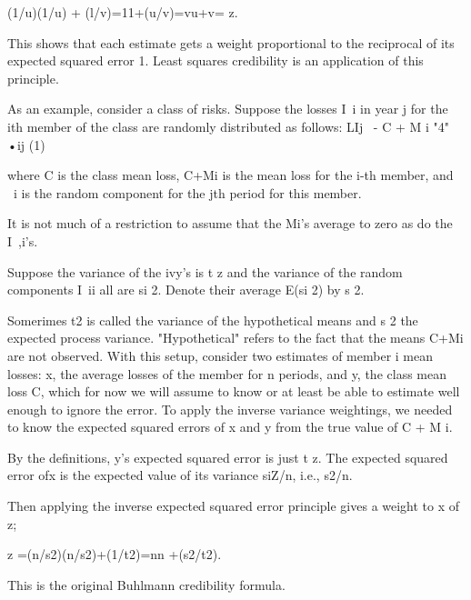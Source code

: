   (1/u)(1/u) + (l/v)=11+(u/v)=vu+v= z.

This shows that each estimate gets a weight proportional to the reciprocal of its expected squared error 1. Least squares credibility is
an application of this principle.

As an example, consider a class of risks. Suppose the losses I~i in year j for the ith member of the
class are randomly distributed as follows:
LIj ~- C + M i "4" •ij (1)

where C is the class mean loss, C+Mi is the mean loss for the i-th member, and ~i is the random
component for the jth period for this member. 

It is not much of a restriction to assume that the Mi's average to zero as do the I~,i's. 

Suppose the variance of the ivy's is t z and the variance of the random components I~ii all are si 2. Denote their average E(si 2) by s 2.

Somerimes t2 is called the variance of the hypothetical means and s 2 the expected process variance.
"Hypothetical" refers to the fact that the means C+Mi are not observed.
With this setup, consider two estimates of member i mean losses: x, the average losses of the
member for n periods, and y, the class mean loss C, which for now we will assume to know or at
least be able to estimate well enough to ignore the error. To apply the inverse variance weightings,
we needed to know the expected squared errors of x and y from the true value of C + M i.

By the definitions, y's expected squared error is just t z. The expected squared error ofx is the
expected value of its variance siZ/n, i.e., s2/n. 

Then applying the inverse expected squared error principle gives a weight to x of z;

	z =(n/s2)(n/s2)+(1/t2)=nn +(s2/t2). 

This is the original
Buhlmann credibility formula.
